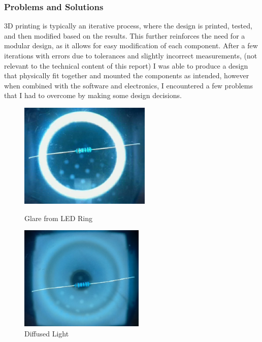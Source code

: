 \subsubsection{Problems and Solutions}
3D printing is typically an iterative process, where the design is printed, tested, and then modified based on the results.
This further reinforces the need for a modular design, as it allows for easy modification of each component.
After a few iterations with errors due to tolerances and slightly incorrect measurements, (not relevant to the technical content of this report)
I was able to produce a design that physically fit together and mounted the components as intended, however when combined with the software
and electronics, I encountered a few problems that I had to overcome by making some design decisions.

\begin{figure}
    \begin{minipage}[t]{0.49\textwidth}
        \centering
        \includegraphics[width=\textwidth,height=5cm, keepaspectratio]{imgs/design/ringlight.jpg}
        \caption{Glare from LED Ring}
        \label{fig:glare}
    \end{minipage}
    \hfill
    \begin{minipage}[t]{0.49\textwidth}
        \centering
        \includegraphics[width=\textwidth,height=5cm, keepaspectratio]{imgs/design/diffusedlight.jpg}
        \caption{Diffused Light}
        \label{fig:diffusedlight}
    \end{minipage}
\end{figure}

